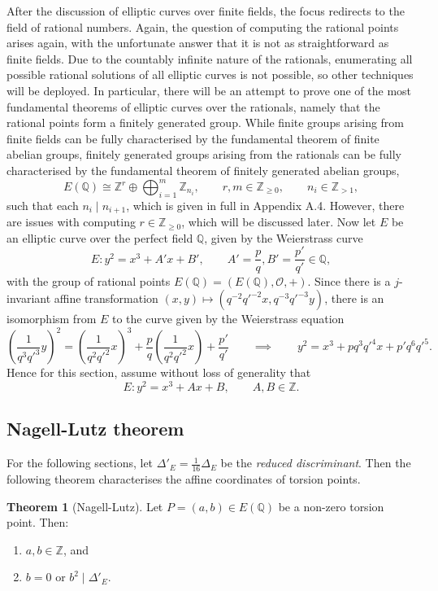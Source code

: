 \documentclass{article}
\newcommand{\Z}{\mathbb{Z}}
\newcommand{\Q}{\mathbb{Q}}
\newcommand{\rb}[1]{\left( #1 \right)}
\theoremstyle{definition}
\newtheorem{theorem}[proposition]{Theorem}
\begin{document}
After the discussion of elliptic curves over finite fields, the focus redirects to the field of rational numbers. Again, the question of computing the rational points arises again, with the unfortunate answer that it is not as straightforward as finite fields. Due to the countably infinite nature of the rationals, enumerating all possible rational solutions of all elliptic curves is not possible, so other techniques will be deployed. In particular, there will be an attempt to prove one of the most fundamental theorems of elliptic curves over the rationals, namely that the rational points form a finitely generated group. While finite groups arising from finite fields can be fully characterised by the fundamental theorem of finite abelian groups, finitely generated groups arising from the rationals can be fully characterised by the fundamental theorem of finitely generated abelian groups,
$$ E\rb{\Q} \cong \Z^r \oplus \bigoplus_{i = 1}^m \Z_{n_i}, \qquad r, m \in \Z_{\ge 0}, \qquad n_i \in \Z_{> 1}, $$
such that each $ n_i \mid n_{i + 1} $, which is given in full in Appendix A.4. However, there are issues with computing $ r \in \Z_{\ge 0} $, which will be discussed later. Now let $ E $ be an elliptic curve over the perfect field $ \Q $, given by the Weierstrass curve
$$ E : y^2 = x^3 + A'x + B', \qquad A' = \dfrac{p}{q}, B' = \dfrac{p'}{q'} \in \Q, $$
with the group of rational points $ E\rb{\Q} = \rb{E\rb{\Q}, \mathcal{O}, +} $. Since there is a $ j $-invariant affine transformation $ \rb{x, y} \mapsto \rb{q^{-2}q'^{-2}x, q^{-3}q'^{-3}y} $, there is an isomorphism from $ E $ to the curve given by the Weierstrass equation
$$ \rb{\dfrac{1}{q^3q'^3}y}^2 = \rb{\dfrac{1}{q^2q'^2}x}^3 + \dfrac{p}{q}\rb{\dfrac{1}{q^2q'^2}x} + \dfrac{p'}{q'} \qquad \implies \qquad y^2 = x^3 + pq^3q'^4x + p'q^6q'^5. $$
Hence for this section, assume without loss of generality that
$$ E : y^2 = x^3 + Ax + B, \qquad A, B \in \Z. $$

\subsection{Nagell-Lutz theorem}

For the following sections, let $ \Delta'_E = \tfrac{1}{16}\Delta_E $ be the \emph{reduced discriminant}. Then the following theorem characterises the affine coordinates of torsion points.

\begin{theorem}[Nagell-Lutz]
\label{thm:nagelllutz}
Let $ P = \rb{a, b} \in E\rb{\Q} $ be a non-zero torsion point. Then:
\begin{enumerate}
\item $ a, b \in \Z $, and
\item $ b = 0 $ or $ b^2 \mid \Delta'_E $.
\end{enumerate}
\end{theorem}
\end{document}
